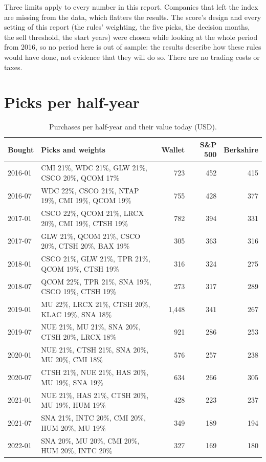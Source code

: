 \documentclass[11pt,a4paper]{article}
\begin{document}
Three limits apply to every number in this report. Companies that left the index are missing from the data, which flatters the results. The score's design and every setting of this report (the rules' weighting, the five picks, the decision months, the sell threshold, the start years) were chosen while looking at the whole period from 2016, so no period here is out of sample: the results describe how these rules would have done, not evidence that they will do so. There are no trading costs or taxes.

\section{Picks per half-year}
\begin{table}[H]
\centering
\small
\caption{Purchases per half-year and their value today (USD).}\label{tab:picks}
\begin{tabular}{l p{9.2cm} r r r }
\hline
Bought & Picks and weights & Wallet & S\&P 500 & Berkshire \\
\hline
2016-01 & CMI 21\%, WDC 21\%, GLW 21\%, CSCO 20\%, QCOM 17\% & 723 & 452 & 415 \\
2016-07 & WDC 22\%, CSCO 21\%, NTAP 19\%, CMI 19\%, QCOM 19\% & 755 & 428 & 377 \\
2017-01 & CSCO 22\%, QCOM 21\%, LRCX 20\%, CMI 19\%, CTSH 19\% & 782 & 394 & 331 \\
2017-07 & GLW 21\%, QCOM 21\%, CSCO 20\%, CTSH 20\%, BAX 19\% & 305 & 363 & 316 \\
2018-01 & CSCO 21\%, GLW 21\%, TPR 21\%, QCOM 19\%, CTSH 19\% & 316 & 324 & 275 \\
2018-07 & QCOM 22\%, TPR 21\%, SNA 19\%, CSCO 19\%, CTSH 19\% & 273 & 317 & 289 \\
2019-01 & MU 22\%, LRCX 21\%, CTSH 20\%, KLAC 19\%, SNA 18\% & 1,448 & 341 & 267 \\
2019-07 & NUE 21\%, MU 21\%, SNA 20\%, CTSH 20\%, LRCX 18\% & 921 & 286 & 253 \\
2020-01 & NUE 21\%, CTSH 21\%, SNA 20\%, MU 20\%, CMI 18\% & 576 & 257 & 238 \\
2020-07 & CTSH 21\%, NUE 21\%, HAS 20\%, MU 19\%, SNA 19\% & 634 & 266 & 305 \\
2021-01 & NUE 21\%, HAS 21\%, CTSH 20\%, MU 19\%, HUM 19\% & 428 & 223 & 237 \\
2021-07 & SNA 21\%, INTC 20\%, CMI 20\%, HUM 20\%, MU 19\% & 349 & 189 & 194 \\
2022-01 & SNA 20\%, MU 20\%, CMI 20\%, HUM 20\%, INTC 20\% & 327 & 169 & 180 \\

\end{tabular}
\end{table}
\end{document}
